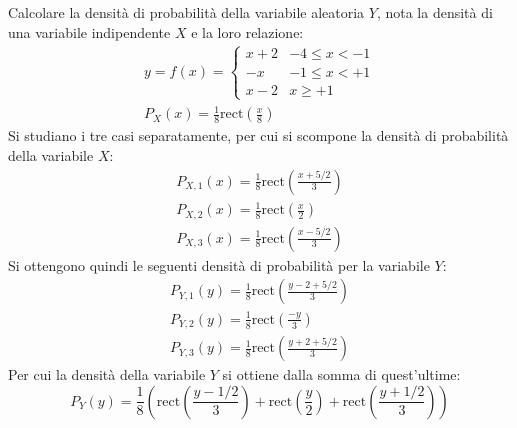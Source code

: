 \documentclass{article}
\newcommand{\rect}{\mbox{rect}}
\begin{document}
Calcolare la densità di probabilità della variabile aleatoria $Y$, nota la densità di una variabile indipendente $X$ e la loro relazione:
\begin{gather*}
    y=f(x)=\begin{cases}
        x+2&-4\leq x<-1\\
        -x&-1\leq x<+1\\
        x-2&x\geq +1
    \end{cases}\\
    P_X(x)=\displaystyle\frac{1}{8}\rect\left(\frac{x}{8}\right)
\end{gather*}
Si studiano i tre casi separatamente, per cui si scompone la densità di probabilità della variabile $X$:
\begin{gather*}
    P_{X,1}(x)=\displaystyle\frac{1}{8}\rect\left(\frac{x+5/2}{3}\right)\\
    P_{X,2}(x)=\displaystyle\frac{1}{8}\rect\left(\frac{x}{2}\right)\\
    P_{X,3}(x)=\displaystyle\frac{1}{8}\rect\left(\frac{x-5/2}{3}\right)
\end{gather*}
Si ottengono quindi le seguenti densità di probabilità per la variabile $Y$:
\begin{gather*}
    P_{Y,1}(y)=\displaystyle\frac{1}{8}\rect\left(\frac{y-2+5/2}{3}\right)\\
    P_{Y,2}(y)=\displaystyle\frac{1}{8}\rect\left(\frac{-y}{3}\right)\\
    P_{Y,3}(y)=\displaystyle\frac{1}{8}\rect\left(\frac{y+2+5/2}{3}\right)
\end{gather*}
Per cui la densità della variabile $Y$ si ottiene dalla somma di quest'ultime:
\begin{equation}
    P_Y(y)=\displaystyle\frac{1}{8}\left(\rect\left(\frac{y-1/2}{3}\right)+\rect\left(\frac{y}{2}\right)+\rect\left(\frac{y+1/2}{3}\right)\right)
\end{equation}
\end{document}
